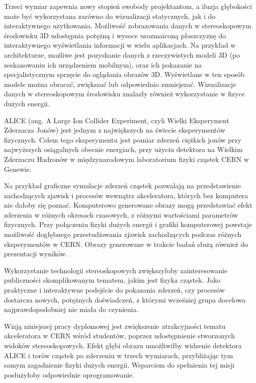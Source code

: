 Trzeci wymiar zapewnia nowy stopień swobody projektantom, a iluzja głębokości może być wykorzystana zarówno do wizualizacji statycznych, jak i do interaktywnego użytkowania. Możliwość zobrazowania danych w stereoskopowym środowisku 3D udostępnia potężną i wysoce urozmaiconą płaszczyznę do interaktywnego wyświetlania informacji w wielu aplikacjach. Na przykład w architekturze, możliwe jest pozyskanie danych z rzeczywistych modeli 3D (po zeskanowaniu ich urządzeniem mobilnym), oraz ich pokazanie na specjalistycznym sprzęcie do oglądania obrazów 3D. Wyświetlane w ten sposób modele można obracać, zwiększać lub odpowiednio zmniejszać. Wizualizacje danych w stereoskopowym środowisku znalazły również wykorzystanie w fizyce dużych energii. 

ALICE (ang. A Large Ion Collider Experiment, czyli Wielki Eksperyment Zderzacza Jonów) jest jednym z największych na świecie eksperymentów fizycznych. Celem tego eksperymentu jest pomiar zderzeń ciężkich jonów przy najwyższych osiągalnych obecnie energiach, przy użyciu detektora na Wielkim Zderzaczu Hadronów w międzynarodowym laboratorium fizyki cząstek CERN w Genewie. 

Na przykład graficzne symulacje zderzeń cząstek pozwalają na przedstawienie zachodzących zjawisk i procesów wewnątrz akceleratora, których bez komputera nie dałoby się poznać. Komputerowo generowane obrazy mogą przedstawiać efekt zderzenia w różnych okresach czasowych, z różnymi wartościami parametrów fizycznych. Przy połączeniu fizyki dużych energii i grafiki komputerowej powstaje możliwość dogłębnego przestudiowania zjawisk zachodzących podczas różnych eksperymentów w CERN. Obrazy generowane w trakcie badań służą również do prezentacji wyników.

Wykorzystanie technologii stereoskopowych zwiększyłoby zainteresowanie publiczności skomplikowanym tematem, jakim jest fizyka cząstek. Jako praktyczne i interaktywne podejście do pokazania zderzeń, czy procesów dostarcza nowych, potężnych doświadczeń, z którymi wcześniej grupa docelowa najprawdopodobniej nie miała do czynienia. 

Wizją niniejszej pracy dyplomowej jest zwiększenie atrakcyjności tematu akceleratora w CERN wśród studentów, poprzez udostępnienie stworzonych widoków stereoskopowych. Efekt głębi obrazu umożliwiłby widzenie detektora ALICE i torów cząstek po zderzeniu w trzech wymiarach, przybliżając tym samym zagadnienie fizyki dużych energii. Wsparciem do spełnienia tej misji posłużyłoby odpowiednie oprogramowanie. 

